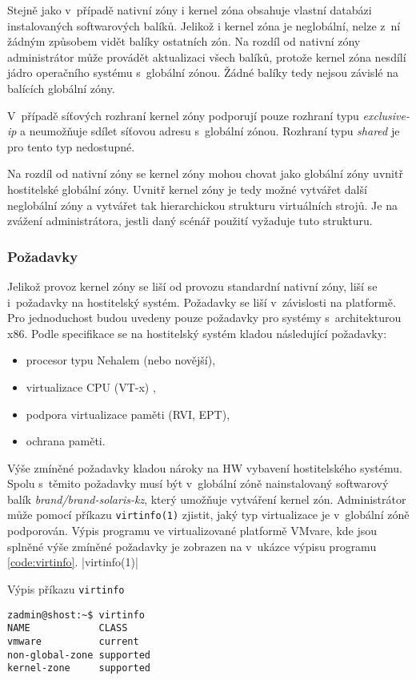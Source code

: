 Stejně jako v~případě nativní zóny i kernel zóna obsahuje vlastní databázi instalovaných softwarových balíků. Jelikož i 
kernel zóna je neglobální, nelze z~ní žádným způsobem vidět balíky ostatních zón. Na rozdíl od nativní zóny administrátor
může provádět aktualizaci všech balíků, protože kernel zóna nesdílí jádro operačního systému s~globální zónou. Žádné balíky
tedy nejsou závislé na balících globální zóny.

V~případě síťových rozhraní kernel zóny podporují pouze rozhraní typu \textit{exclusive-ip} a neumožňuje sdílet síťovou adresu
s~globální zónou. Rozhraní typu \textit{shared} je pro tento typ nedostupné.

Na rozdíl od nativní zóny se kernel zóny mohou chovat jako globální zóny uvnitř hostitelské globální zóny.
Uvnitř kernel zóny je tedy možné vytvářet další neglobální zóny a vytvářet tak hierarchickou strukturu virtuálních strojů. Je
na zvážení administrátora, jestli daný scénář použití vyžaduje tuto strukturu.
\subsubsection*{Požadavky}
\label{chapter:zones:types:kernel:demands}
Jelikož provoz kernel zóny se liší od provozu standardní nativní zóny, liší se i~požadavky na hostitelský systém. Požadavky
se liší v~závislosti na platformě. Pro jednoduchost budou uvedeny pouze požadavky pro systémy s~architekturou x86. Podle specifikace
\cite{oracle:solaris:zones:kernel_zones_requiremets} se na hostitelský systém kladou následující požadavky:
\begin{itemize}
 \item procesor typu Nehalem (nebo novější),
 \item virtualizace CPU (VT-x) ,
 \item podpora virtualizace paměti (RVI, EPT),
 \item ochrana paměti.
\end{itemize}
Výše zmíněné požadavky kladou nároky na HW vybavení hostitelského systému. Spolu s~těmito požadavky musí být v~globální zóně
nainstalovaný softwarový balík \textit{brand/brand-solaris-kz}, který umožňuje vytváření kernel zón. Administrátor může pomocí příkazu
\verb|virtinfo(1)| zjistit, jaký typ virtualizace je v~globální zóně podporován. Výpis programu ve virtualizované platformě
VMvare, kde jsou splněné výše zmíněné požadavky je zobrazen na v~ukázce výpisu programu \ref{code:virtinfo}.
|virtinfo(1)|
\begin{listing}
  \caption{Výpis příkazu \texttt{virtinfo}}
  \label{code:virtinfo}
  \begin{verbatim}
zadmin@shost:~$ virtinfo
NAME            CLASS     
vmware          current   
non-global-zone supported
kernel-zone     supported
  \end{verbatim}
\end{listing}
